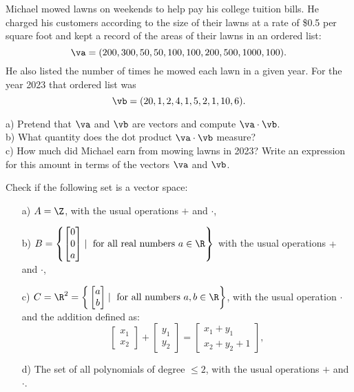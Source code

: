 \begin{problem}
    Michael mowed lawns on weekends to help pay his college tuition bills. He charged his customers according to the size of their lawns at a rate of \$0.5 per square foot and kept a record of the areas of their lawns in an ordered list:
$$\va = (200, 300, 50, 50, 100, 100, 200, 500, 1000, 100) .$$
He also listed the number of times he mowed each lawn in a given year. For the year 2023 that ordered list was
$$\vb = (20, 1, 2, 4, 1, 5, 2, 1, 10, 6) .$$

a) Pretend that $\va$ and $\vb$ are vectors and compute $\va  \cdot  \vb$.
\\


b) What quantity does the dot product $\va  \cdot  \vb$ measure?
\\

c) How much did Michael earn from mowing lawns in
2023? Write an expression for this amount in terms of the vectors
$\va$ and $\vb$.
\end{problem}

\newpage

\begin{problem}
    Check if the following set is a vector space:

    \begin{enumerate}
        \item [a)] $A = \Z$, with the usual operations $+$ and $\cdot$,
                
        \item [b)] $B = \left\{ \begin{bmatrix} 0 \\ 0 \\ a\end{bmatrix} \mid \text{ for all real numbers }a\in\R\right\}$ with the usual operations $+$ and $\cdot$,
        
        
        \item [c)] $C =  \R^2 = \bigg\{ \begin{bmatrix} a \\ b \end{bmatrix} \mid \text{ for all numbers }a, b\in\R\bigg\}$, with the usual operation $\cdot$ and the addition defined as:
        \[  \begin{bmatrix} x_1 \\ x_2 \end{bmatrix}  +  \begin{bmatrix} y_1 \\ y_2 \end{bmatrix}  = \begin{bmatrix} x_1+y_1 \\ x_2+y_2+1 \end{bmatrix}, \]

        
        
        \item [d)] The set of all polynomials of degree $\le 2$, with the usual operations $+$ and $\cdot$.


    \end{enumerate}

\end{problem}

